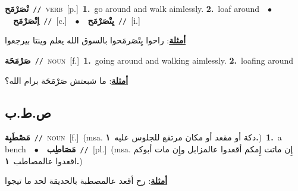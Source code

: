\documentclass[10pt,a4paper,twoside]{article} %
\begin{document}
\begin{multicols}{2}
{\setlength\topsep{0pt}\textbf{\foreignlanguage{arabic}{تْصَرْمَح}}\ {\color{gray}\texttt{//}\color{black}}\ \textsc{verb}\ [p.]\ \textbf{1.}~go around and walk aimlessly.  \textbf{2.}~loaf around\ \ $\bullet$\ \ \setlength\topsep{0pt}\textbf{\foreignlanguage{arabic}{اِتْصَرْمَح}}\ {\color{gray}\texttt{//}\color{black}}\ [c.]\ \ $\bullet$\ \ \setlength\topsep{0pt}\textbf{\foreignlanguage{arabic}{يِتْصَرْمَح}}\ {\color{gray}\texttt{//}\color{black}}\ [i.]\  \begin{flushright}\color{gray}\foreignlanguage{arabic}{\textbf{\underline{\foreignlanguage{arabic}{أمثلة}}}: راحوا يِتْصَرمَحوا بالسوق الله يعلم وينتا بيرجعوا}\end{flushright}\color{black}} \vspace{2mm}

{\setlength\topsep{0pt}\textbf{\foreignlanguage{arabic}{صَرْمَحَة}}\ {\color{gray}\texttt{//}\color{black}}\ \textsc{noun}\ [f.]\ \textbf{1.}~going around and walking aimlessly.  \textbf{2.}~loafing around\  \begin{flushright}\color{gray}\foreignlanguage{arabic}{\textbf{\underline{\foreignlanguage{arabic}{أمثلة}}}: ما شبعتش صَرْمَحَة برام الله؟}\end{flushright}\color{black}} \vspace{2mm}

\vspace{-3mm}
\subsection*{\color{blue}\foreignlanguage{arabic}{ص.ط.ب}\color{blue}{}} 

{\setlength\topsep{0pt}\textbf{\foreignlanguage{arabic}{مَصْطَبِة}}\ {\color{gray}\texttt{//}\color{black}}\ \textsc{noun}\ [f.]\ \color{gray}(msa. \foreignlanguage{arabic}{دكة أو مقعد أو مكان مرتفع للجلوس عليه}~\foreignlanguage{arabic}{\textbf{١.}})\color{black}\ \textbf{1.}~a bench\ \ $\bullet$\ \ \setlength\topsep{0pt}\textbf{\foreignlanguage{arabic}{مَصَاطِب}}\ {\color{gray}\texttt{//}\color{black}}\ [pl.]\ \color{gray}(msa. \foreignlanguage{arabic}{إِن ماتت إِمكم أقعدوا عالمزابل وإِن مات أبوكم اقعدوا عالمصاطب}~\foreignlanguage{arabic}{\textbf{١.}})\color{black}\  \begin{flushright}\color{gray}\foreignlanguage{arabic}{\textbf{\underline{\foreignlanguage{arabic}{أمثلة}}}: رح أقعد عالمصطبة بالحديقة لحد ما تيجوا}\end{flushright}\color{black}} \vspace{2mm}


\end{multicols}
\end{document}
